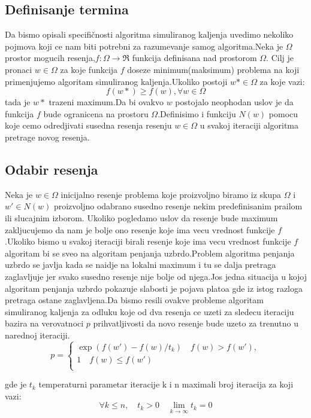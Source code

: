 \documentclass[a4paper]{article}
\begin{document}
\subsection{Definisanje termina}
Da bismo opisali specifičnosti algoritma simuliranog kaljenja uvedimo nekoliko pojmova koji ce nam biti potrebni za razumevanje samog algoritma.Neka je $\Omega$ prostor mogucih resenja,$f:\Omega \rightarrow \Re$ funkcija definisana nad prostorom $\Omega$. Cilj je pronaci  $w\in\Omega$ za koje funkcija $f$ doseze minimum(maksimum) problema na koji primenjujemo algoritam simuliranog kaljenja.Ukoliko postoji $w*\in\Omega$ za koje  vazi:$$f(w*)\geq f(w) , \forall w \in \Omega$$ tada je $w*$ trazeni maximum.Da bi ovakvo $w$ postojalo neophodan uslov je da funkcija $f$ bude ogranicena na prostoru $\Omega$.Definisimo i funkciju $N(w)$ pomocu koje cemo odredjivati susedna resenja resenju  $w\in\Omega$ u svakoj iteraciji algoritma pretrage novog resenja. \par

\subsection{Odabir resenja}
Neka je $w\in\Omega$ inicijalno resenje problema koje proizvoljno biramo iz skupa $\Omega$ i $w'\in N(w)$ proizvoljno odabrano susedno resenje nekim predefinisanim prailom ili slucajnim izborom. Ukoliko pogledamo uslov da resenje bude maximum zakljucujemo da nam je bolje ono resenje koje ima vecu vrednost funkcije $f$.Ukoliko bismo u svakoj iteraciji birali resenje koje ima vecu vrednost funkcije $f$ algoritam bi se sveo na algoritam penjanja uzbrdo.Problem algoritma penjanja uzbrdo se javlja kada se naidje na lokalni maximum i tu se dalja pretraga zaglavljuje jer svako susedno resenje nije bolje od njega.Jos jedna situacija u kojoj algoritam penjanja uzbrdo pokazuje slabosti je pojava platoa gde iz istog razloga pretraga ostane zaglavljena.Da bismo resili ovakve probleme algoritam simuliranog kaljenja za odluku koje od dva resenja ce uzeti za sledecu iteraciju bazira na verovatnoci $p$ prihvatljivosti da novo resenje bude uzeto za trenutno u narednoj iteraciji.
\[ p =
  \begin{cases}
    \exp(f(w')-f(w)/t_k)  \quad f(w) > f(w'),\\
    1  \quad f(w) \leq f(w')\\
  \end{cases}
\]


gde je $t_k$ temperaturni parametar iteracije k i n maximali broj iteracija za koji vazi:
$$\forall k\leq n, \quad t_k > 0 \quad \lim_{k \to \infty}t_k=0 $$
\end{document}
